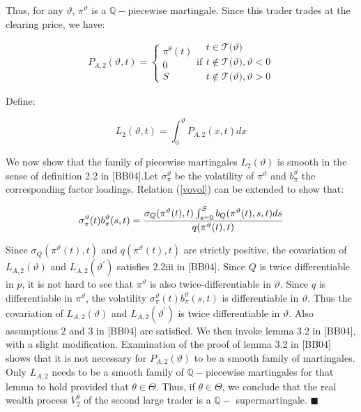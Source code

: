 \documentclass{article}
\begin{document}
Thus, for any $\vartheta $, $\pi ^{\vartheta }$ is a $\mathbb{Q}-$piecewise
martingale. Since this trader trades at the clearing price, we have:

\begin{equation*}
P_{A,2}(\vartheta ,t)=\left\{ 
\begin{array}{c}
\pi ^{\theta }(t) \\ 
0 \\ 
S%
\end{array}%
\right. \text{if}%
\begin{array}{c}
t\in \mathcal{T(}\vartheta ) \\ 
t\notin \mathcal{T(}\vartheta ),\vartheta <0 \\ 
t\notin \mathcal{T(}\vartheta ),\vartheta >0%
\end{array}%
\end{equation*}

Define:

\begin{equation*}
L_{2}(\vartheta ,t)=\int_{0}^{\vartheta }P_{A,2}(x,t)dx
\end{equation*}

We now show that the family of piecewise martingales $L_{2}(\vartheta )$ is
smooth in the sense of definition 2.2 in [BB04]$.$Let $\sigma _{\pi
}^{\vartheta }$ be the volatility of $\pi ^{\vartheta }$ and $b_{\pi
}^{\vartheta }$ the corresponding factor loadings. Relation (\ref{vovol})
can be extended to show that:

\begin{equation*}
\sigma _{\pi }^{\vartheta }(t)b_{\pi }^{\vartheta }(s,t)=\frac{\sigma
_{Q}(\pi ^{\vartheta }(t),t)\int_{s=0}^{S}b_{Q}(\pi ^{\vartheta }(t),s,t)ds}{%
q(\pi ^{\vartheta }(t),t)}
\end{equation*}

Since $\sigma _{Q}(\pi ^{\vartheta }(t),t)$ and $q(\pi ^{\vartheta }(t),t)$
are strictly positive, the covariation of $L_{A,2}(\vartheta )$ and $%
L_{A,2}(\vartheta ^{\prime })$ satisfies 2.2iii in [BB04]. Since $Q$ is
twice differentiable in $p$, it is not hard to see that $\pi ^{\vartheta }$
is also twice-differentiable in $\vartheta $. Since $q$ is differentiable in 
$\pi ^{\vartheta }$, the volatility $\sigma _{\pi }^{\vartheta }(t)b_{\pi
}^{\vartheta }(s,t)$ is differentiable in $\vartheta $. Thus the covariation
of $L_{A,2}(\vartheta )$ and $L_{A,2}(\vartheta ^{\prime })$ is twice
differentiable in $\vartheta $. Also assumptions 2 and 3 in [BB04] are
satisfied. We then invoke lemma 3.2 in [BB04], with a slight modification.
Examination of the proof of lemma 3.2 in [BB04] shows that it is not
necessary for $P_{A,2}(\vartheta )$ to be a smooth family of martingales.
Only $L_{A,2}$ needs to be a smooth family of $\mathbb{Q}-$piecewise
martingales for that lemma to hold provided that $\theta \in \Theta $. Thus,
if $\theta \in \Theta $, we conclude that the real wealth process $%
V_{2}^{\theta }$ of the second large trader is a $\mathbb{Q-}$
supermartingale. $\blacksquare $
\end{document}
